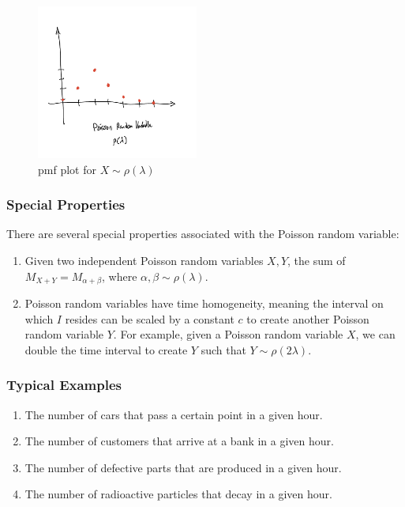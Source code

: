 \documentclass{article}
\begin{document}
\begin{figure}[!htb]
    \begin{center}
        \includegraphics[height=2in]{q2.jpeg}
        \caption{pmf plot for $X \sim \rho(\lambda)$}
    \end{center}
\end{figure} 

\subsubsection{Special Properties}

There are several special properties associated with the Poisson random variable:

\begin{enumerate}
    \item Given two independent Poisson random variables $X, Y$, the sum of $M_{X+Y} = M_{\alpha+\beta}$, where $\alpha, \beta \sim \rho(\lambda)$.
    \item Poisson random variables have time homogeneity, meaning the interval on which $I$ resides can be scaled by a constant $c$ to create another Poisson random variable $Y$. For example, given a Poisson random variable $X$, we can double the time interval to create $Y$ such that $Y \sim \rho(2\lambda)$.
\end{enumerate}

\subsubsection{Typical Examples}

\begin{enumerate}
    \item The number of cars that pass a certain point in a given hour.
    \item The number of customers that arrive at a bank in a given hour.
    \item The number of defective parts that are produced in a given hour.
    \item The number of radioactive particles that decay in a given hour.
\end{enumerate}
\end{document}

